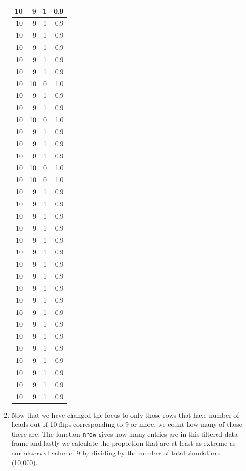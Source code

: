 \documentclass[]{tufte-book}
\begin{document}
\begin{enumerate}
\begin{tabular}{r|r|r|r}
  10 & 9 & 1 & 0.9\\
  \hline
  10 & 9 & 1 & 0.9\\
  \hline
  10 & 9 & 1 & 0.9\\
  \hline
  10 & 9 & 1 & 0.9\\
  \hline
  10 & 9 & 1 & 0.9\\
  \hline
  10 & 9 & 1 & 0.9\\
  \hline
  10 & 10 & 0 & 1.0\\
  \hline
  10 & 9 & 1 & 0.9\\
  \hline
  10 & 9 & 1 & 0.9\\
  \hline
  10 & 10 & 0 & 1.0\\
  \hline
  10 & 9 & 1 & 0.9\\
  \hline
  10 & 9 & 1 & 0.9\\
  \hline
  10 & 9 & 1 & 0.9\\
  \hline
  10 & 10 & 0 & 1.0\\
  \hline
  10 & 10 & 0 & 1.0\\
  \hline
  10 & 9 & 1 & 0.9\\
  \hline
  10 & 9 & 1 & 0.9\\
  \hline
  10 & 9 & 1 & 0.9\\
  \hline
  10 & 9 & 1 & 0.9\\
  \hline
  10 & 9 & 1 & 0.9\\
  \hline
  10 & 9 & 1 & 0.9\\
  \hline
  10 & 9 & 1 & 0.9\\
  \hline
  10 & 9 & 1 & 0.9\\
  \hline
  10 & 9 & 1 & 0.9\\
  \hline
  10 & 9 & 1 & 0.9\\
  \hline
  10 & 9 & 1 & 0.9\\
  \hline
  10 & 9 & 1 & 0.9\\
  \hline
  10 & 9 & 1 & 0.9\\
  \hline
  10 & 9 & 1 & 0.9\\
  \hline
  10 & 9 & 1 & 0.9\\
  \hline
  10 & 9 & 1 & 0.9\\
  \hline
  10 & 9 & 1 & 0.9\\
  \hline
  10 & 9 & 1 & 0.9\\
  \hline
  \end{tabular}
\item
  Now that we have changed the focus to only those rows that have number
  of heads out of 10 flips corresponding to 9 or more, we count how many
  of those there are. The function \texttt{nrow} gives how many entries
  are in this filtered data frame and lastly we calculate the proportion
  that are at least as extreme as our observed value of 9 by dividing by
  the number of total simulations (10,000).
\end{enumerate}
\end{document}
